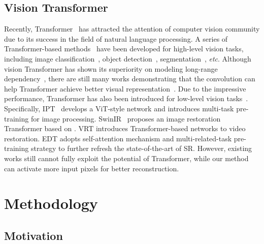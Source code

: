 \documentclass[10pt,twocolumn,letterpaper]{article}
\begin{document}
\subsection{Vision Transformer}
Recently, Transformer~\cite{transformer} has attracted the attention of computer vision community due to its success in the field of natural language processing. A series of Transformer-based methods~\cite{vit,localvit,cvt,pvt,swin_t,shufflet,cswin,twins,palet,ceit,uniformer,moa} have been developed for high-level vision tasks, including image classification~\cite{swin_t,vit,localvit,ramachandran2019studying,vaswani2021scaling}, object detection~\cite{liu2020deep,touvron2021training,swin_t,detr,twins}, segmentation~\cite{wu2020visual,pvt,dat,cao2021swin}, \textit{etc}. Although vision Transformer has shown its superiority on modeling long-range dependency~\cite{vit,cka}, there are still many works demonstrating that the convolution can help Transformer achieve better visual representation~\cite{cvt,vitc,hrformer,ceit,uniformer}. Due to the impressive performance, Transformer has also been introduced for low-level vision tasks~\cite{ipt,uformer,swinir,vsrt,maxim,restormer,vrt,edt}. Specifically, IPT~\cite{ipt} develops a ViT-style network and introduces multi-task pre-training for image processing. SwinIR~\cite{swinir} proposes an image restoration Transformer based on \cite{swin_t}. VRT\cite{vrt} introduces Transformer-based networks to video restoration. EDT\cite{edt} adopts self-attention mechanism and multi-related-task pre-training strategy to further refresh the state-of-the-art of SR. However, existing works still cannot fully exploit the potential of Transformer, while our method can activate more input pixels for better reconstruction.

\section{Methodology}
\subsection{Motivation}
\label{Motivation}
\end{document}
